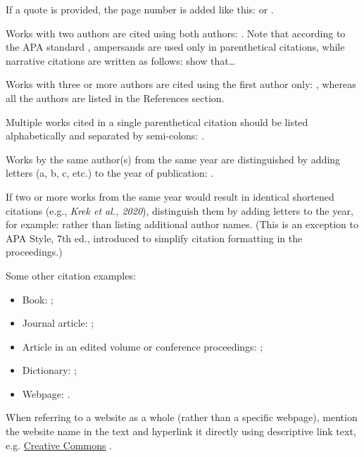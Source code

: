 \documentclass{article}
\begin{document}
If a quote is provided, the page number is added like this: \parencite[107]{leech1992corpora} or \textcite[107--108]{leech1992corpora}. 

Works with two authors are cited using both authors: \parencite{studije2005korpusnem}. Note that according to the APA standard \parencite[see][]{apa-author-date}, ampersands are used only in parenthetical citations, while narrative citations are written as follows: \textcite{studije2005korpusnem} show that\ldots{}  

Works with three or more authors are cited using the first author only: \parencite{biber1998corpus}, whereas all the authors are listed in the References section. 

Multiple works cited in a single parenthetical citation should be listed alphabetically and separated by semi-colons: \parencite{erjavec-infotheca, tei}. 

Works by the same author(s) from the same year are distinguished by adding letters (a, b, c, etc.) to the year of publication: \parencite{erjavec-multext}. 

If two or more works from the same year would result in identical shortened citations (e.g., \textit{Krek et al., 2020}), distinguish them by adding letters to the year, for example: \parencite{krek2020a-ssj500k, krek2020b-gf} rather than listing additional author names. (This is an exception to APA Style, 7th ed., introduced to simplify citation formatting in the proceedings.) 

Some other citation examples:

    \begin{itemize}
        \item Book: \parencite{biber1998corpus, studije2005korpusnem};
        \item Journal article: \parencite{biber1996investigating, erjavec-infotheca};
        \item Article in an edited volume or conference proceedings: \parencite{leech1992corpora, erjavec-multext};
        \item Dictionary: \parencite{sinclair1987collins, sskj};
        \item Webpage: \parencite{scott2008wordsmith, tei}.
    \end{itemize}

When referring to a website as a whole (rather than a specific webpage),  mention the website name in the text and hyperlink it directly using descriptive link text, e.g. \href{http://creativecommons.org/}{Creative Commons} \parencite{apa-website}.
\end{document}
